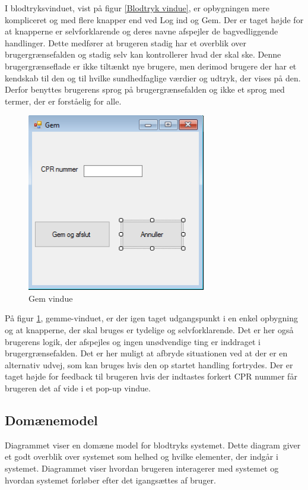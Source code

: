 I blodtryksvinduet, vist på figur \ref{Blodtryk vindue}, er opbygningen mere kompliceret og med flere knapper end ved Log ind og Gem. Der er taget højde for at knapperne er selvforklarende og deres navne afspejler de bagvedliggende handlinger. Dette medfører at brugeren stadig har et overblik over brugergrænsefalden og stadig selv kan kontrollerer hvad der skal ske. Denne brugergrænseflade er ikke tiltænkt nye brugere, men derimod brugere der har et kendskab til den og til hvilke sundhedfaglige værdier og udtryk, der vises på den.  Derfor benyttes brugerens sprog på brugergrænsefalden og ikke et sprog med termer, der er forståelig for alle. 

\begin{figure}[H]
	\centering
	\includegraphics[width=0.7\textwidth]{Figurer/GUI/Gem_GUI}
	\caption{Gem vindue}
	\label{Gem vindue}
\end{figure}

På figur \ref{Gem vindue}, gemme-vinduet, er der igen taget udgangspunkt i en enkel opbygning og at knapperne, der skal bruges er tydelige og selvforklarende. Det er her også brugerens logik, der afspejles og ingen unødvendige ting er inddraget i brugergrænsefalden. Det er her muligt at afbryde situationen ved at der er en alternativ udvej, som kan bruges hvis den op startet handling fortrydes. Der er taget højde for feedback til brugeren hvis der indtastes forkert CPR nummer får brugeren det af vide i et pop-up vindue. 

\subsection{Domænemodel}
Diagrammet viser en domæne model for blodtryks systemet. Dette diagram giver et godt overblik over systemet som helhed og hvilke elementer, der indgår i systemet. Diagrammet viser hvordan brugeren interagerer med systemet og hvordan systemet forløber efter det igangsættes af bruger. 

